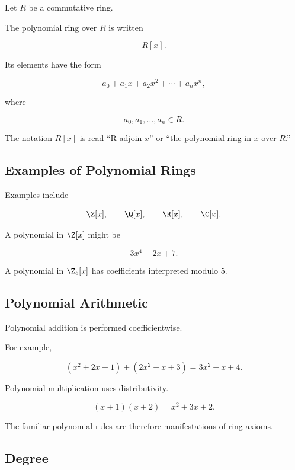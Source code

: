 Let \(R\) be a commutative ring.

The polynomial ring over \(R\) is written

\[ R[x]. \]

Its elements have the form

\[ a_0+a_1x+a_2x^2+\cdots+a_nx^n, \]

where

\[ a_0,a_1,\ldots,a_n\in R. \]

The notation \(R[x]\) is read ``R adjoin \(x\)'' or ``the polynomial ring in
\(x\) over \(R\).''

\subsection{Examples of Polynomial Rings}
\label{subsec:polynomial-ring-examples}

Examples include

\[ \Z[x],\qquad\Q[x],\qquad\R[x],\qquad\C[x]. \]

A polynomial in \(\Z[x]\) might be

\[ 3x^4-2x+7. \]

A polynomial in \(\Z_5[x]\) has coefficients interpreted modulo \(5\).

\subsection{Polynomial Arithmetic}
\label{subsec:ring-polynomial-arithmetic}

Polynomial addition is performed coefficientwise.

For example,

\[ (x^2+2x+1)+(2x^2-x+3)=3x^2+x+4. \]

Polynomial multiplication uses distributivity.

\[ (x+1)(x+2)=x^2+3x+2. \]

The familiar polynomial rules are therefore manifestations of ring axioms.

\subsection{Degree}
\label{subsec:ring-polynomial-degree}

